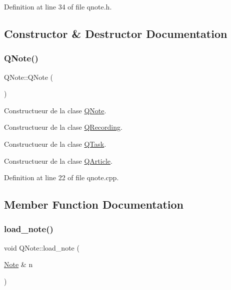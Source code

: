 Definition at line 34 of file qnote.\+h.



\subsection{Constructor \& Destructor Documentation}
\mbox{\label{class_q_note_a4f3980466d58be3cb5e15d2e45d74840}} 
\subsubsection{\texorpdfstring{Q\+Note()}{QNote()}}
{\footnotesize\ttfamily Q\+Note\+::\+Q\+Note (\begin{DoxyParamCaption}{ }\end{DoxyParamCaption})}



Constructueur de la clase \hyperlink{class_q_note}{Q\+Note}. 

Constructueur de la clase \hyperlink{class_q_recording}{Q\+Recording}.

Constructueur de la clase \hyperlink{class_q_task}{Q\+Task}.

Constructueur de la clase \hyperlink{class_q_article}{Q\+Article}. 

Definition at line 22 of file qnote.\+cpp.



\subsection{Member Function Documentation}
\mbox{\label{class_q_note_adca0a8f2851fbb1c3843ca4fe7957c11}} 
\subsubsection{\texorpdfstring{load\+\_\+note()}{load\_note()}}
{\footnotesize\ttfamily void Q\+Note\+::load\+\_\+note (\begin{DoxyParamCaption}\item[{\hyperlink{class_note}{Note} \&}]{n }\end{DoxyParamCaption})\hspace{0.3cm}{\ttfamily [virtual]}}



